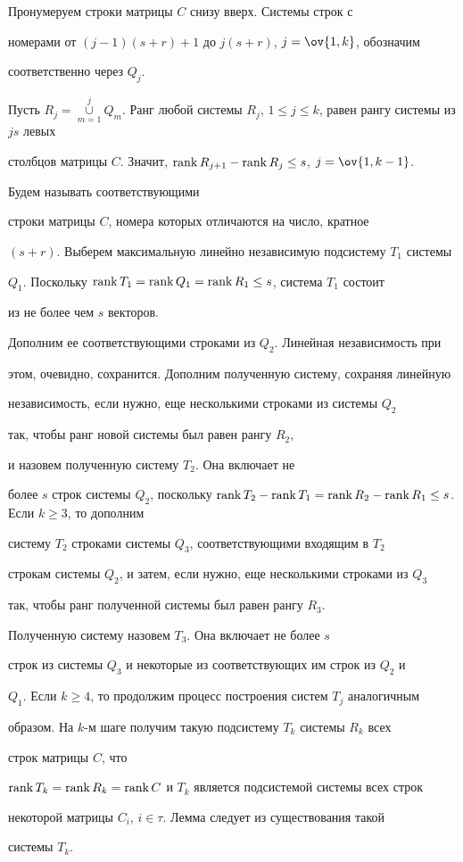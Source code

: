  


\begin{pf} 


Пронумеруем строки матрицы $C$ снизу вверх. Системы строк с 


номерами от $(j-1)(s+r)+1$ до $j(s+r)$, $j=\ov{1,k}$, обозначим 


соответственно через $Q_j$. 


Пусть $R_j=\mathop{\cup}\limits^j_{m=1}Q_m$. Ранг любой системы $R_j$, $1\le 


j\le k$, равен рангу системы из $js$ левых 


столбцов матрицы $C$. Значит, $\operatorname{rank} R_{j+1}-\operatorname{rank} R_j\le s$, $j=\ov{1,k-1}$. 


Будем называть соответствующими 


строки матрицы $C$, номера которых отличаются на число, кратное 


$(s+r)$. Выберем максимальную линейно независимую подсистему $T_1$ системы 


$Q_1$. Поскольку $\operatorname{rank} T_1=\operatorname{rank} Q_1=\operatorname{rank} R_1\le s$, система $T_1$ состоит 


из не более чем $s$ векторов. 


Дополним ее соответствующими строками из $Q_2$. Линейная независимость при 


этом, очевидно, сохранится. Дополним полученную систему, сохраняя линейную 


независимость, если нужно, еще несколькими строками из системы $Q_2$ 


так, чтобы ранг новой системы был равен рангу $R_2$, 


и назовем полученную систему $T_2$. Она включает не 


более $s$ строк системы $Q_2$, поскольку $\rank T_2-\rank T_1=\rank R_2-\rank 


R_1\le s$. Если $k\ge3$, то дополним 


систему $T_2$ строками системы $Q_3$, соответствующими входящим в $T_2$ 


строкам системы $Q_2$, и затем, если нужно, еще несколькими строками из $Q_3$ 


так, чтобы ранг полученной системы был равен рангу $R_3$. 


Полученную систему назовем $T_3$. Она включает не более $s$ 


строк из системы $Q_3$ и некоторые из соответствующих им строк из $Q_2$ и 


$Q_1$. Если $k\ge4$, то продолжим процесс построения систем $T_j$ аналогичным 


образом. На $k$-м шаге получим такую подсистему $T_k$ системы $R_k$ всех 


строк матрицы $C$, что 


$\operatorname{rank} T_k=\operatorname{rank} R_k=\operatorname{rank} C$ и $T_k$ является подсистемой системы всех строк 


некоторой матрицы $C_i$, $i\in\tau$. Лемма следует из существования такой 


системы $T_k$. 


\end{pf} 


